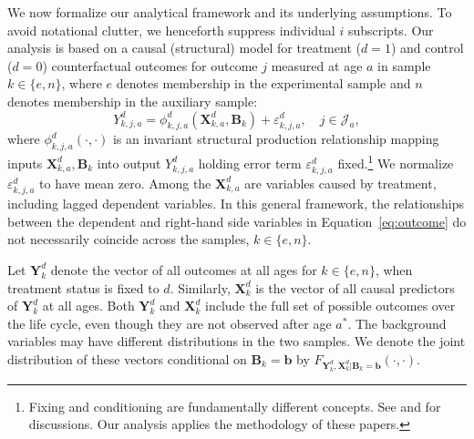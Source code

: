 \noindent We now formalize our analytical framework and its underlying assumptions. To avoid notational clutter, we henceforth suppress individual $i$ subscripts. Our analysis is based on a causal (structural) model for treatment ($d=1$) and control ($d=0$) counterfactual outcomes for outcome $j$ measured at age $a$ in sample $k \in \{e,n\}$, where $e$ denotes membership in the experimental sample and $n$ denotes membership in the auxiliary sample:
\begin{equation}\label{eq:outcome}
Y^d_{k,j,a} = \phi^d_{k,j,a} (\bm{X}^d_{k,a}, \bm{B}_k) + \varepsilon^d_{k,j,a}, \quad j \in \mathcal{J}_a,
\end{equation}
where $\phi^d_{k,j,a}\left( \cdot, \cdot \right)$ is an invariant structural production relationship mapping inputs $\bm{X}^d_{k,a}, \bm{B}_k$ into output $Y^d_{k,j,a}$ holding error term $\varepsilon^d_{k,j,a}$ fixed.\footnote{Fixing and conditioning are fundamentally different concepts. See \cite{Haavelmo_1943_Econometrica} and \citet{Heckman_Pinto_2015_EconometTheory} for discussions. Our analysis applies the methodology of these papers.} We normalize $\varepsilon^d_{k,j,a}$ to have mean zero. Among the $\bm{X}^d_{k,a}$ are variables caused by treatment, including lagged dependent variables. In this general framework, the relationships between the dependent and right-hand side variables in Equation~\eqref{eq:outcome} do not necessarily coincide across the samples, $k \in \{e,n\}$.

\noindent Let $\bm{Y}_k^d$ denote the vector of all outcomes at all ages for $k \in \{e, n \}$, when treatment status is fixed to $d$. Similarly, $\bm{X}_k^d$ is the vector of all causal predictors of $\bm{Y}_k^d$ at all ages. Both $\bm{Y}_k^d$ and $\bm{X}_k^d$ include the full set of possible outcomes over the life cycle, even though they are not observed after age $a^*$. The background variables may have different distributions in the two samples. We denote the joint distribution of these vectors conditional on $\bm{B}_k = \bm{b}$ by $F_{\bm{Y}_k^d, \bm{X}_k^d | \bm{B}_k = \bm{b}}(\cdot,\cdot)$.

